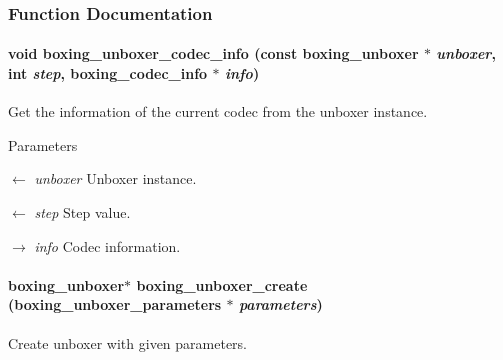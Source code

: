 \subsubsection{Function Documentation}
\hypertarget{group__unboxer_ga8ae669c445fbfae38b44931e2572f0ba}{
\paragraph[{boxing\_\-unboxer\_\-codec\_\-info}]{\setlength{\rightskip}{0pt plus 5cm}void boxing\_\-unboxer\_\-codec\_\-info (const boxing\_\-unboxer $\ast$ {\em unboxer}, \/  int {\em step}, \/  {\bf boxing\_\-codec\_\-info} $\ast$ {\em info})}\hfill}
\label{group__unboxer_ga8ae669c445fbfae38b44931e2572f0ba}
Get the information of the current codec from the unboxer instance.


\begin{DoxyParams}{Parameters}
\item[\mbox{$\leftarrow$} {\em unboxer}]Unboxer instance. \item[\mbox{$\leftarrow$} {\em step}]Step value. \item[\mbox{$\rightarrow$} {\em info}]Codec information. \end{DoxyParams}
\hypertarget{group__unboxer_gac2e6043a93bbf6541d50332dbf86b471}{
\paragraph[{boxing\_\-unboxer\_\-create}]{\setlength{\rightskip}{0pt plus 5cm}boxing\_\-unboxer$\ast$ boxing\_\-unboxer\_\-create ({\bf boxing\_\-unboxer\_\-parameters} $\ast$ {\em parameters})}\hfill}
\label{group__unboxer_gac2e6043a93bbf6541d50332dbf86b471}
Create unboxer with given parameters.


